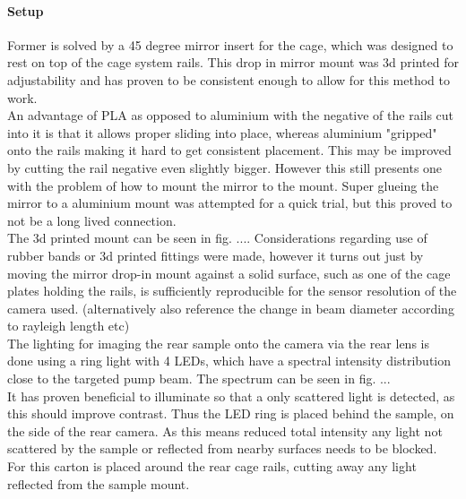\documentclass[twoside,openright]{scrreprt}
\begin{document}
\paragraph{Setup}
Former is solved by a 45 degree mirror insert for the cage, which was designed to rest on top of the cage system rails. This drop in mirror mount was 3d printed for adjustability and has proven to be consistent enough to allow for this method to work. \\
An advantage of PLA as opposed to aluminium with the negative of the rails cut into it is that it allows proper sliding into place, whereas aluminium "gripped" onto the rails making it hard to get consistent placement. This may be improved by cutting the rail negative even slightly bigger. However this still presents one with the problem of how to mount the mirror to the mount. Super glueing  the mirror to a aluminium mount was attempted for a quick trial, but this proved to not be a long lived connection.\\
The 3d printed mount can be seen in fig. ....
Considerations regarding use of rubber bands or 3d printed fittings were made, however it turns out just by moving the mirror drop-in mount against a solid surface, such as one of the cage plates holding the rails, is sufficiently reproducible for the sensor resolution of the camera used. (alternatively also reference the change in beam diameter according to rayleigh length etc)\\

The lighting for imaging the rear sample onto the camera via the rear lens is done using a ring light with 4 LEDs, which have a spectral intensity distribution close to the targeted pump beam. The spectrum can be seen in fig. ...\\
It has proven beneficial to illuminate so that a only scattered light is detected, as this should improve contrast. Thus the LED ring is placed behind the sample, on the side of the rear camera. As this means reduced total intensity any light not scattered by the sample or reflected from nearby surfaces needs to be blocked. For this carton is placed around the rear cage rails, cutting away any light reflected from the sample mount.
\end{document}
